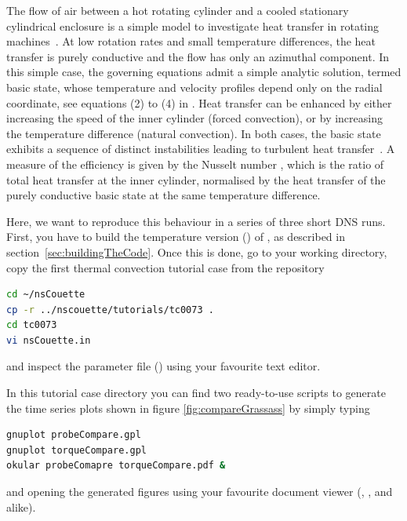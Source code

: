 \documentclass[a4paper, 11pt, DIV=11]{scrartcl}
\begin{document}
The flow of air between a hot rotating cylinder and a cooled stationary
cylindrical enclosure is a simple model to investigate heat transfer in
rotating machines~\cite{Howey2012}. At low rotation rates and small temperature differences,
the heat transfer is purely conductive and the flow has only an azimuthal
component. In this simple case, the governing equations admit a simple
analytic solution, termed basic state, whose temperature and velocity
profiles depend only on the radial coordinate, see \eg equations (2) to (4)
in \cite{Lopez2015}. Heat transfer can be enhanced by either increasing the
speed of the inner cylinder (forced convection), or by increasing the
temperature difference (natural convection). In both cases, the basic state exhibits
a sequence of distinct instabilities leading to turbulent heat transfer~\cite{Lopez2015}. A
measure of the efficiency is given by the Nusselt number \Nui, which is the
ratio of total heat transfer at the inner cylinder, normalised by the heat transfer
of the purely conductive basic state at the same temperature difference.
\par
Here, we want to reproduce this behaviour in a series of three short DNS runs.
First, you have to build the temperature version () of \nsc,
as described in section~\ref{sec:buildingTheCode}.
Once this is done, go to your working directory, copy the first thermal convection
tutorial case from the repository
\begin{lstlisting}[language=bash]
cd ~/nsCouette
cp -r ../nscouette/tutorials/tc0073 .
cd tc0073
vi nsCouette.in
\end{lstlisting}
and inspect the parameter file () using your favourite
text editor.



In this tutorial case directory you can find two ready-to-use scripts to
generate the time series plots shown in figure \ref{fig:compareGrassass} by
simply typing
\begin{lstlisting}[language=bash]
gnuplot probeCompare.gpl
gnuplot torqueCompare.gpl
okular probeComapre torqueCompare.pdf &
\end{lstlisting}
and opening the generated  figures using your favourite document
viewer (\eg {}, ,  and alike).
\end{document}
